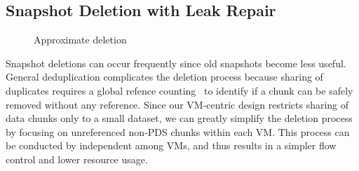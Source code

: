 
\subsection{Snapshot Deletion with Leak Repair}
\label{sect:delete}


\begin{figure}[htbp]
  \centering
  \caption{Approximate deletion}
  \label{fig:deletion_flow}
\end{figure}

Snapshot deletions can occur frequently since old snapshots become less useful.
General deduplication complicates the deletion process because sharing of duplicates
requires a global refence counting~\cite{Guo2011,Fabiano2013} 
 to identify if  a chunk can be  safely removed without any reference.
%
Since our VM-centric design restricts sharing of data chunks only to a small dataset,
we can greatly simplify the deletion process by 
focusing on  unreferenced non-PDS chunks within each VM. 
This process can be conducted by independent among VMs, and thus results in  a simpler flow control and 
lower resource usage. 

